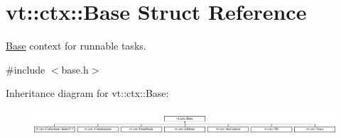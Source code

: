 \hypertarget{structvt_1_1ctx_1_1_base}{}\section{vt\+:\+:ctx\+:\+:Base Struct Reference}
\label{structvt_1_1ctx_1_1_base}


\hyperlink{structvt_1_1ctx_1_1_base}{Base} context for runnable tasks.  




{\ttfamily \#include $<$base.\+h$>$}

Inheritance diagram for vt\+:\+:ctx\+:\+:Base\+:\begin{figure}[H]
\begin{center}
\leavevmode
\includegraphics[height=0.914286cm]{structvt_1_1ctx_1_1_base}
\end{center}
\end{figure}
